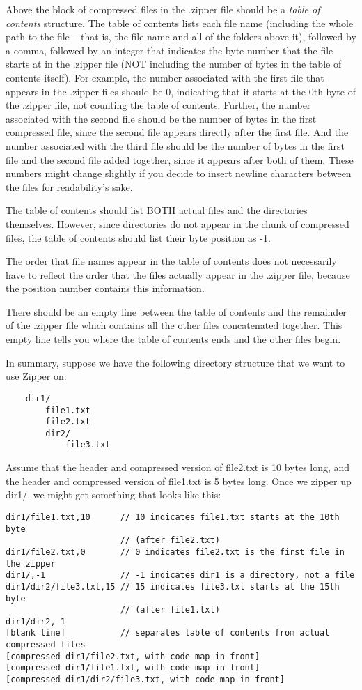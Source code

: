 \documentclass[11pt]{article}
\begin{document}
Above the block of compressed files in the .zipper file should be a \emph{table of contents} structure. The table of contents lists each file name (including the whole path to the file -- that is, the file name and all of the folders above it), followed by a comma, followed by an integer that indicates the byte number that the file starts at in the .zipper file (NOT including the number of bytes in the table of contents itself). For example, the number associated with the first file that appears in the .zipper files should be 0, indicating that it starts at the 0th byte of the .zipper file, not counting the table of contents. Further, the number associated with the second file should be the number of bytes in the first compressed file, since the second file appears directly after the first file. And the number associated with the third file should be the number of bytes in the first file and the second file added together, since it appears after both of them. These numbers might change slightly if you decide to insert newline characters between the files for readability's sake.

The table of contents should list BOTH actual files and the directories themselves. However, since directories do not appear in the chunk of compressed files, the table of contents should list their byte position as -1.

The order that file names appear in the table of contents does not necessarily have to reflect the order that the files actually appear in the .zipper file, because the position number contains this information.

There should be an empty line between the table of contents and the remainder of the .zipper file which contains all the other files concatenated together. This empty line tells you where the table of contents ends and the other files begin.

\newpage

In summary, suppose we have the following directory structure that we want to use Zipper on:
{\small
\begin{verbatim}
    dir1/
        file1.txt
        file2.txt
        dir2/
            file3.txt
\end{verbatim}
}

Assume that the header and compressed version of file2.txt is 10 bytes long, and the header and compressed version of file1.txt is 5 bytes long. Once we zipper up dir1/, we might get something that looks like this:

{
\small
\begin{verbatim}
dir1/file1.txt,10      // 10 indicates file1.txt starts at the 10th byte
                       // (after file2.txt)
dir1/file2.txt,0       // 0 indicates file2.txt is the first file in the zipper
dir1/,-1               // -1 indicates dir1 is a directory, not a file
dir1/dir2/file3.txt,15 // 15 indicates file3.txt starts at the 15th byte
                       // (after file1.txt)
dir1/dir2,-1
[blank line]           // separates table of contents from actual compressed files
[compressed dir1/file2.txt, with code map in front]
[compressed dir1/file1.txt, with code map in front]
[compressed dir1/dir2/file3.txt, with code map in front]
\end{verbatim}
}
\end{document}
